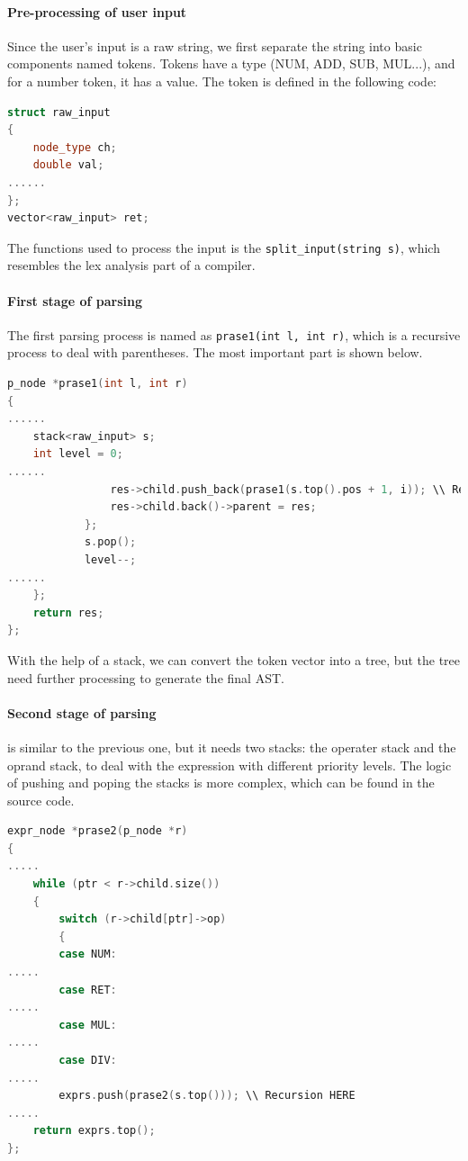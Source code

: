 \documentclass[cn,black,12pt,normal]{elegantnote}
\begin{document}
\paragraph{Pre-processing of user input} Since the user's input is a raw string, we first separate the string into basic components named tokens. Tokens have a type (NUM, ADD, SUB, MUL...), and for a number token, it has a value. The token is defined in the following code:
\begin{lstlisting}[language = C++]
struct raw_input
{
	node_type ch;
	double val;
......
};
vector<raw_input> ret;
\end{lstlisting}
The functions used to process the input is the \lstinline{split_input(string s)}, which resembles the lex analysis part of a compiler.

\paragraph{First stage of parsing}
The first parsing process is named as \lstinline{prase1(int l, int r)}, which is a recursive process to deal with parentheses. The most important part is shown below.
\begin{lstlisting}[language = C++]
p_node *prase1(int l, int r)
{
......
	stack<raw_input> s;
	int level = 0;
......
				res->child.push_back(prase1(s.top().pos + 1, i)); \\ Recursion HERE
				res->child.back()->parent = res;
			};
			s.pop();
			level--;
......
	};
	return res;
};
\end{lstlisting}
With the help of a stack, we can convert the token vector into a tree, but the tree need further processing to generate the final AST.

\paragraph{Second stage of parsing} is similar to the previous one, but it needs two stacks: the operater stack and the oprand stack, to deal with the expression with different priority levels. The logic of pushing and poping the stacks is more complex, which can be found in the source code.
\begin{lstlisting}[language = C++]
expr_node *prase2(p_node *r)
{
.....
	while (ptr < r->child.size())
	{
		switch (r->child[ptr]->op)
		{
		case NUM:
.....
		case RET:
.....
		case MUL:
.....
		case DIV:
.....
        exprs.push(prase2(s.top())); \\ Recursion HERE
.....
	return exprs.top();
};
\end{lstlisting}
\end{document}
